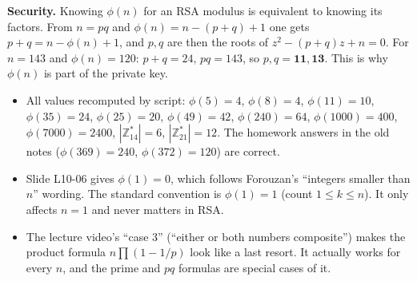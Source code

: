 \textbf{Security.} Knowing $\phi(n)$ for an RSA modulus is equivalent to knowing its factors. From $n = pq$ and $\phi(n) = n - (p + q) + 1$ one gets $p + q = n - \phi(n) + 1$, and $p, q$ are then the roots of $z^2 - (p+q)z + n = 0$. For $n = 143$ and $\phi(n) = 120$: $p + q = 24$, $pq = 143$, so $p, q = \mathbf{11, 13}$. This is why $\phi(n)$ is part of the private key.

\begin{fixbox}
\begin{itemize}
  \item All values recomputed by script: $\phi(5) = 4$, $\phi(8) = 4$, $\phi(11) = 10$, $\phi(35) = 24$, $\phi(25) = 20$, $\phi(49) = 42$, $\phi(240) = 64$, $\phi(1000) = 400$, $\phi(7000) = 2400$, $|\mathbb{Z}_{14}^*| = 6$, $|\mathbb{Z}_{21}^*| = 12$. The homework answers in the old notes ($\phi(369) = 240$, $\phi(372) = 120$) are correct.
  \item Slide L10-06 gives $\phi(1) = 0$, which follows Forouzan's ``integers smaller than $n$'' wording. The standard convention is $\phi(1) = 1$ (count $1 \le k \le n$). It only affects $n = 1$ and never matters in RSA.
  \item The lecture video's ``case 3'' (``either or both numbers composite'') makes the product formula $n\prod(1 - 1/p)$ look like a last resort. It actually works for every $n$, and the prime and $pq$ formulas are special cases of it.
\end{itemize}
\end{fixbox}
